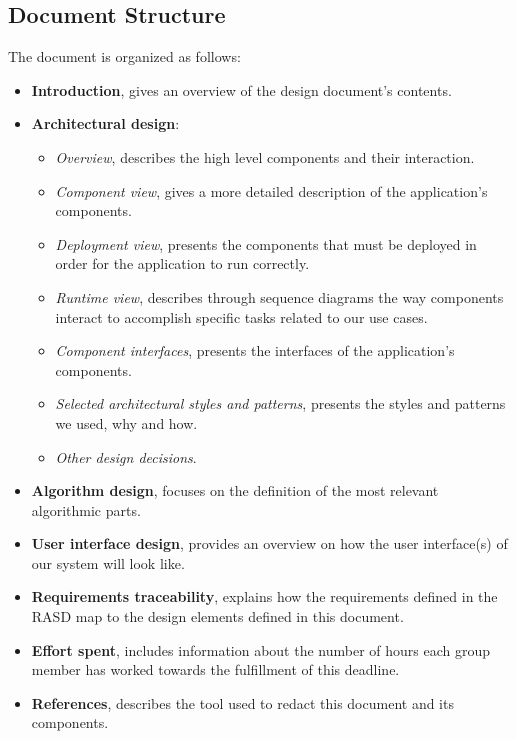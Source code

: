 \subsection{Document Structure}
The document is organized as follows:
\begin{itemize}
	\item \textbf{Introduction}, gives an overview of the design document's contents.
	\item \textbf{Architectural design}:
	\begin{itemize}
		\item \textit{Overview}, describes the high level components and their interaction.
		\item \textit{Component view}, gives a more detailed description of the application's components.
		\item \textit{Deployment view}, presents the components that must be deployed in order for the application to run correctly.
		\item \textit{Runtime view}, describes through sequence diagrams the way components interact to accomplish specific tasks related to our use cases.
		\item \textit{Component interfaces}, presents the interfaces of the application's components.
		\item \textit{Selected architectural styles and patterns}, presents the styles and patterns we used, why and how.  
		\item \textit{Other design decisions}.
	\end{itemize}
	\item \textbf{Algorithm design}, focuses on the definition of the most relevant algorithmic parts.
	\item \textbf{User interface design}, provides an overview on how the  user interface(s) of our system will look like.  
	\item \textbf{Requirements traceability}, explains how the requirements defined in the RASD map to the design elements defined in this document. 
	\item \textbf{Effort spent}, includes information about the number of hours each group member has worked towards the fulfillment of this deadline. 
	\item \textbf{References}, describes the tool used to redact this document and its components.
\end{itemize}